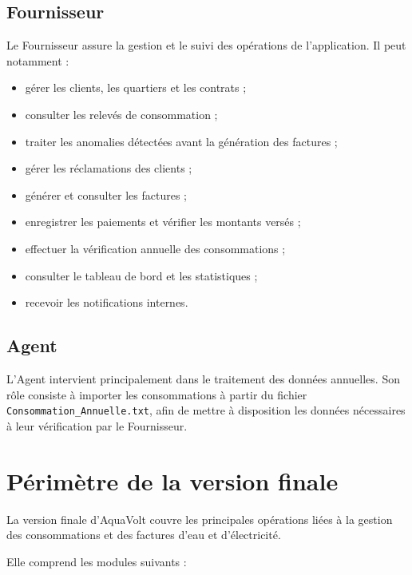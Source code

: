 \subsection{Fournisseur}

Le Fournisseur assure la gestion et le suivi des opérations de l'application. Il peut notamment :

\begin{itemize}[leftmargin=*]
    \item gérer les clients, les quartiers et les contrats ;
    \item consulter les relevés de consommation ;
    \item traiter les anomalies détectées avant la génération des factures ;
    \item gérer les réclamations des clients ;
    \item générer et consulter les factures ;
    \item enregistrer les paiements et vérifier les montants versés ;
    \item effectuer la vérification annuelle des consommations ;
    \item consulter le tableau de bord et les statistiques ;
    \item recevoir les notifications internes.
\end{itemize}

\subsection{Agent}

L'Agent intervient principalement dans le traitement des données annuelles. Son rôle consiste à importer les consommations à partir du fichier \texttt{Consommation\_Annuelle.txt}, afin de mettre à disposition les données nécessaires à leur vérification par le Fournisseur.

\section{Périmètre de la version finale}

La version finale d'AquaVolt couvre les principales opérations liées à la gestion des consommations et des factures d'eau et d'électricité.

Elle comprend les modules suivants :

